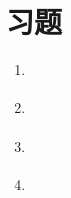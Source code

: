 \section{习题}\label{sec:习题06}
\begin{enumerate}
      \item \circletwo \citep{761554,10.1080/2151237X.2007.10129235}
      \item \circletwo \citep{10.1145/1242073.1242155}
      \item \circletwo \citet{5740919}\citet{Jacobs2012}
      \item \circlethree \citet{ng:hal-02551481}
\end{enumerate}